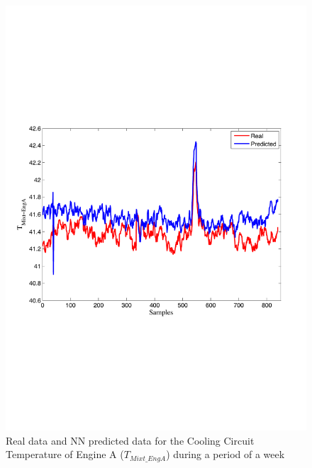 \begin{figure}
\includegraphics[width=1\textwidth]{nna0bis.pdf}
\caption{Real data and NN predicted data for the Cooling Circuit Temperature of Engine A ($T_{Mixt\_EngA}$) during a period of a week}
\label{TcoolA}
\end{figure}

